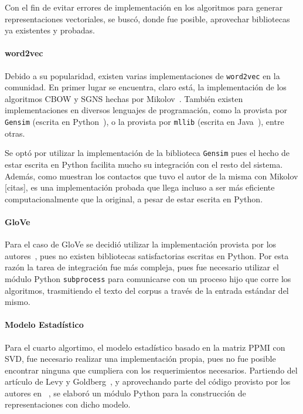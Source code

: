 Con el fin de evitar errores de implementación en los algoritmos para generar representaciones
vectoriales, se buscó, donde fue posible, aprovechar bibliotecas ya existentes y probadas.

\paragraph{word2vec}

Debido a su popularidad, existen varias implementaciones de \texttt{word2vec} en la comunidad. En
primer lugar se encuentra, claro está, la implementación de los algoritmos CBOW y SGNS hechas por
Mikolov~\cite{Word2vecGoogle}. También existen implementaciones en diversos lenguajes de programación,
como la provista por \texttt{Gensim} (escrita en Python~\cite{RehurekLrec}), o la provista por
\texttt{mllib} (escrita en Java~\cite{Word2vecMLlib}), entre otras.

Se optó por utilizar la implementación de la biblioteca \texttt{Gensim} pues el hecho de estar
escrita en Python facilita mucho su integración con el resto del sistema. Además, como muestran los
contactos que tuvo el autor de la misma con Mikolov [citas], es una implementación probada que llega
incluso a ser más eficiente computacionalmente que la original, a pesar de estar escrita en Python.


\paragraph{GloVe}

Para el caso de GloVe se decidió utilizar la implementación provista por los autores~\cite{Pennington2014},
pues no existen bibliotecas satisfactorias escritas en Python. Por esta razón la tarea de integración fue
más compleja, pues fue necesario utilizar el módulo Python \texttt{subprocess} para comunicarse con
un proceso hijo que corre los algoritmos, trasmitiendo el texto del corpus a través de la entrada
estándar del mismo.


\paragraph{Modelo Estadístico}

Para el cuarto algortimo, el modelo estadístico basado en la matriz PPMI con SVD, fue necesario
realizar una implementación propia, pues no fue posible encontrar ninguna que cumpliera con los
requerimientos necesarios. Partiendo del artículo de Levy y Goldberg~\cite{Levy2015}, y aprovechando
parte del código provisto por los autores en ~\cite{LevyHyperwords}, se elaboró un módulo Python para
la construcción de representaciones con dicho modelo.

